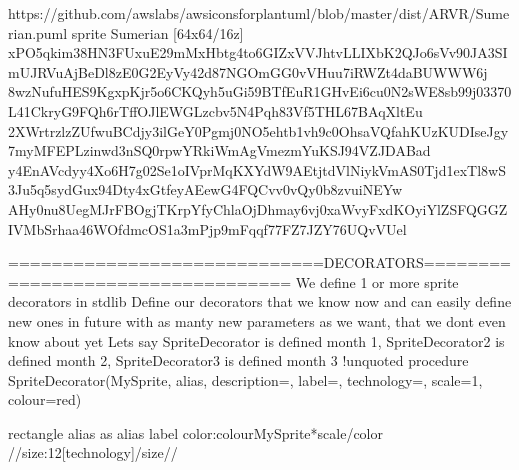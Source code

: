 \documentclass[letterpaper,10pt,english]{sphinxmanual}
\begin{document}
\begin{sphinxVerbatim}[commandchars=\\\{\},numbers=left,firstnumber=1,stepnumber=1]
\PYGZsq{}https://github.com/awslabs/aws\PYGZhy{}icons\PYGZhy{}for\PYGZhy{}plantuml/blob/master/dist/ARVR/Sumerian.puml
sprite \PYGZdl{}Sumerian [64x64/16z] \PYGZob{}
xPO5qkim38HN3FU\PYGZus{}xuE29mMx\PYGZhy{}Hbtg4to6GIZxVVJhtvLLI\PYGZhy{}XbK2QJo6sVv90JA3SImUJRVuAjBeDl8zE0G2EyVy42d87NGOmGG0vVHuu7iRWZt4daBUWWW6j
8w\PYGZus{}zNufuHES9KgxpKjr5o6CKQyh5uGi59BTfEuR1GHvEi6cu0N2sWE8sb99j03370L41CkryG9FQh6rTffOJlEWGLz\PYGZhy{}cbv5N4Pqh83Vf5THL67BA\PYGZhy{}qXltEu\PYGZus{}
2XWrtrzlzZUfwuBCdjy\PYGZus{}3ilGeY0Pgmj0NO5ehtb1vh9c0OhsaV\PYGZus{}Qfa\PYGZus{}hKUzKUDIs\PYGZus{}eJgy7myMFEPLzinwd3nSQ0rpwYR\PYGZus{}kiWmAgVmezmYuKSJ\PYGZus{}94VZJDABad
y4EnAVcdyy4Xo6H\PYGZus{}7g\PYGZhy{}02Se1oIVprMqKX\PYGZus{}YdW9\PYGZus{}AEtjtdVlNiykVmAS0Tjd\PYGZus{}1exTl8wS3Ju5q5sydGux\PYGZhy{}94Dty4xGtfeyAEewG4FQCvv0vQy0b8zvuiN\PYGZus{}EYw
AHy0nu8Ue\PYGZhy{}gMJrFBOgjTKr\PYGZus{}pYfyChlaOjDhmay6vj0xaWvyFxdKOyiYlZSFQGGZIVMbSrhaa46WOf\PYGZhy{}dmcOS1a3mPjp9mFqqf77FZ\PYGZhy{}7JZ\PYGZhy{}Y76UQvV\PYGZus{}Uel
\PYGZcb{}



\PYGZsq{}=============================DECORATORS==================================
\PYGZsq{} We define 1 or more sprite decorators in stdlib
\PYGZsq{} Define our decorators that we know now \PYGZhy{} and can easily define new ones in future with as manty new parameters 
\PYGZsq{} as we want, that we don\PYGZsq{}t even know about yet
\PYGZsq{} Let\PYGZsq{}s say SpriteDecorator is defined month 1, SpriteDecorator2 is defined month 2, SpriteDecorator3 is defined month 3
\PYGZsq{}\PYGZhy{}\PYGZhy{}\PYGZhy{}\PYGZhy{}\PYGZhy{}\PYGZhy{}\PYGZhy{}\PYGZhy{}\PYGZhy{}\PYGZhy{}\PYGZhy{}\PYGZhy{}\PYGZhy{}\PYGZhy{}\PYGZhy{}\PYGZhy{}\PYGZhy{}\PYGZhy{}\PYGZhy{}\PYGZhy{}\PYGZhy{}\PYGZhy{}\PYGZhy{}\PYGZhy{}\PYGZhy{}\PYGZhy{}\PYGZhy{}\PYGZhy{}\PYGZhy{}\PYGZhy{}\PYGZhy{}\PYGZhy{}\PYGZhy{}\PYGZhy{}\PYGZhy{}\PYGZhy{}\PYGZhy{}\PYGZhy{}\PYGZhy{}\PYGZhy{}\PYGZhy{}\PYGZhy{}\PYGZhy{}\PYGZhy{}\PYGZhy{}\PYGZhy{}\PYGZhy{}\PYGZhy{}\PYGZhy{}\PYGZhy{}\PYGZhy{}
!unquoted procedure \PYGZdl{}SpriteDecorator(\PYGZdl{}MySprite, \PYGZdl{}alias, \PYGZdl{}description=\PYGZdq{}\PYGZdq{}, \PYGZdl{}label=\PYGZdq{}\PYGZdq{}, \PYGZdl{}technology=\PYGZdq{}\PYGZdq{}, \PYGZdl{}scale=1, \PYGZdl{}colour=\PYGZdq{}red\PYGZdq{})

rectangle \PYGZdl{}alias as \PYGZdq{}
\PYGZlt{}\PYGZlt{}\PYGZdl{}alias\PYGZgt{}\PYGZgt{}
\PYGZdl{}label
\PYGZlt{}color:\PYGZdl{}colour\PYGZgt{}\PYGZlt{}\PYGZdl{}MySprite*\PYGZdl{}scale\PYGZgt{}\PYGZlt{}/color\PYGZgt{}
//\PYGZlt{}size:12\PYGZgt{}[\PYGZdl{}technology]\PYGZlt{}/size\PYGZgt{}//


\end{sphinxVerbatim}
\end{document}
